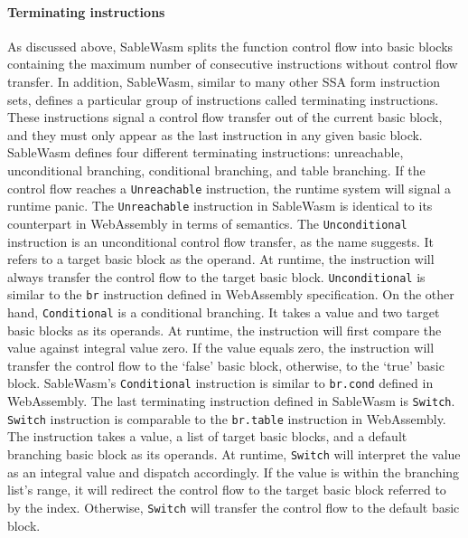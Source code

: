 \paragraph{Terminating instructions}
As discussed above, SableWasm splits the function control flow into basic
blocks containing the maximum number of consecutive instructions without
control flow transfer. In addition, SableWasm, similar to many other SSA form
instruction sets, defines a particular group of instructions called terminating
instructions. These instructions signal a control flow transfer out of the
current basic block, and they must only appear as the last instruction in any
given basic block. SableWasm defines four different terminating instructions:
unreachable, unconditional branching, conditional branching, and table
branching. If the control flow reaches a \texttt{Unreachable} instruction,
the runtime system will signal a runtime panic. The \texttt{Unreachable}
instruction in SableWasm is identical to its counterpart in WebAssembly in
terms of semantics. The \texttt{Unconditional} instruction is an unconditional
control flow transfer, as the name suggests. It refers to a target basic block
as the operand. At runtime, the instruction will always transfer the control
flow to the target basic block. \texttt{Unconditional} is similar to the
\texttt{br} instruction defined in WebAssembly specification. On the other hand,
\texttt{Conditional} is a conditional branching. It takes a value and two
target basic blocks as its operands. At runtime, the instruction will first
compare the value against integral value zero. If the value equals zero, the
instruction will transfer the control flow to the `false' basic block,
otherwise, to the `true' basic block. SableWasm's \texttt{Conditional}
instruction is similar to \texttt{br.cond} defined in WebAssembly. The last
terminating instruction defined in SableWasm is \texttt{Switch}.
\texttt{Switch} instruction is comparable to the \texttt{br.table} instruction
in WebAssembly. The instruction takes a value, a list of target basic blocks,
and a default branching basic block as its operands. At runtime,
\texttt{Switch} will interpret the value as an integral value and dispatch
accordingly. If the value is within the branching list's range, it will
redirect the control flow to the target basic block referred to by the index.
Otherwise, \texttt{Switch} will transfer the control flow to the default basic
block.

